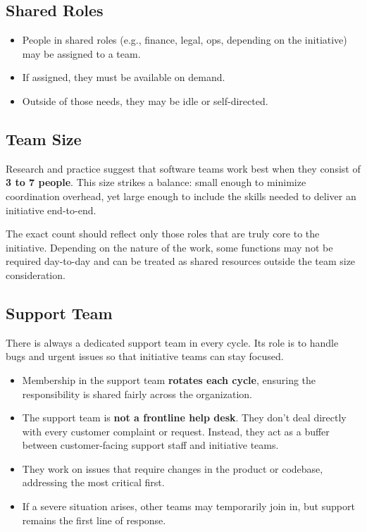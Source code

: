 \documentclass[a4paper]{article}
\begin{document}
\subsection*{Shared Roles}

\begin{itemize}
    \item People in shared roles (e.g., finance, legal, ops, depending on the initiative) may be assigned to a team.
    \item If assigned, they must be available on demand.
    \item Outside of those needs, they may be idle or self-directed.
\end{itemize}

\subsection*{Team Size}

Research and practice suggest that software teams work best when they consist of \textbf{3 to 7 people}. This size strikes a balance: small enough to minimize coordination overhead, yet large enough to include the skills needed to deliver an initiative end-to-end.

The exact count should reflect only those roles that are truly core to the initiative. Depending on the nature of the work, some functions may not be required day-to-day and can be treated as shared resources outside the team size consideration.

\subsection*{Support Team}

There is always a dedicated support team in every cycle. Its role is to handle bugs and urgent issues so that initiative teams can stay focused.

\begin{itemize}
    \item  Membership in the support team \textbf{rotates each cycle}, ensuring the responsibility is shared fairly across the organization.
    \item The support team is \textbf{not a frontline help desk}. They don’t deal directly with every customer complaint or request. Instead, they act as a buffer between customer-facing support staff and initiative teams.
    \item They work on issues that require changes in the product or codebase, addressing the most critical first.
    \item If a severe situation arises, other teams may temporarily join in, but support remains the first line of response.
\end{itemize}
\end{document}
